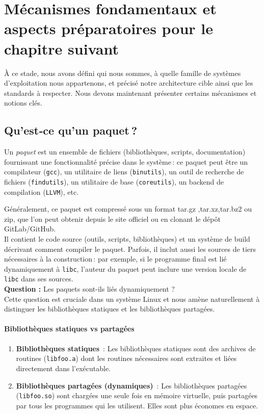 \section{Mécanismes fondamentaux et aspects préparatoires pour le chapitre suivant}

À ce stade, nous avons défini qui nous sommes, à quelle famille de systèmes d’exploitation nous appartenons, et précisé notre architecture cible ainsi que les standards à respecter. Nous devons maintenant présenter certains mécanismes et notions clés.

\subsection{Qu’est‑ce qu’un paquet ?}
\label{sssec:definition-paquet}

Un \emph{paquet} est un ensemble de fichiers (bibliothèques, scripts, documentation) fournissant une fonctionnalité précise dans le système : ce paquet peut être un compilateur (\texttt{gcc}), un utilitaire de liens (\texttt{binutils}), un outil de recherche de fichiers (\texttt{findutils}), un utilitaire de base (\texttt{coreutils}), un backend de compilation (\texttt{LLVM}), etc.

Généralement, ce paquet est compressé sous un format tar.gz ,tar.xz,tar.bz2 ou zip, que l’on peut obtenir depuis le site officiel ou en clonant le dépôt GitLab/GitHub.\\
Il contient le code source (outils, scripts, bibliothèques) et un système de build décrivant comment compiler le paquet. Parfois, il inclut aussi les sources de tiers nécessaires à la construction : par exemple, si le programme final est lié dynamiquement à \texttt{libc}, l’auteur du paquet peut inclure une version locale de \texttt{libc} dans ses sources.\\
\textbf{Question :} Les paquets sont-ils liés dynamiquement ? \\
Cette question est cruciale dans un système Linux et nous amène naturellement à distinguer les bibliothèques statiques et les bibliothèques partagées.
\paragraph{Bibliothèques statiques vs partagées}
\begin{enumerate}
  \item \textbf{Bibliothèques statiques} :  
    Les bibliothèques statiques sont des archives de routines (\texttt{libfoo.a}) dont les routines nécessaires sont extraites et liées directement dans l’exécutable.  
  \item \textbf{Bibliothèques partagées (dynamiques)} :  
    Les bibliothèques partagées (\texttt{libfoo.so}) sont chargées une seule fois en mémoire virtuelle, puis partagées par tous les programmes qui les utilisent. Elles sont plus économes en espace.
\end{enumerate}

